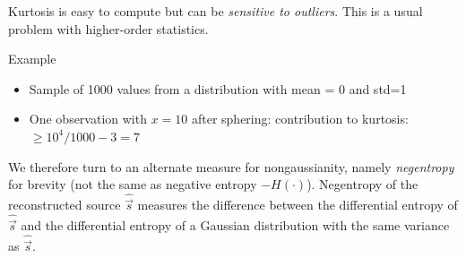 
\begin{frame}
Kurtosis is easy to compute but can be \emph{sensitive to outliers}. 
This is a usual problem with higher-order statistics. 
\begin{block}{Example}
\begin{itemize}
  \item Sample of 1000 values from a distribution with mean = 0 and std=1
  \item One observation with $x=10$ after sphering:
  \itl contribution to kurtosis: $ \geq 10^4/1000 -3 = 7$
\end{itemize}
\end{block}
\end{frame}

We therefore turn to an alternate measure for nongaussianity, namely \emph{negentropy} for brevity (not the same as negative entropy $-H(\cdot)$). Negentropy of the reconstructed source $\widehat{\vec s}$ measures the difference between the differential entropy of $\widehat{\vec s}$ and the differential entropy of a Gaussian distribution with the same variance as $\widehat{\vec s}$.


